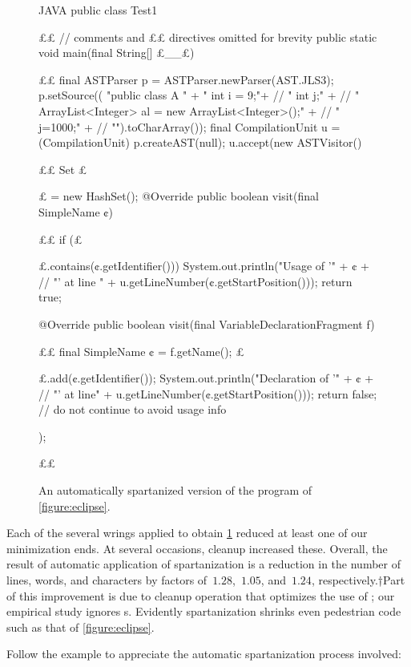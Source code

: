 \begin{figure}[htbp]
  \caption{\label{figure:eclipse:automatic}%
    An automatically spartanized version of
      the \Java program of \cref{figure:eclipse}.
    }
  \begin{adjustbox}{max width=\columnwidth}
\begin{code}[minipage, width=1.22\columnwidth]{JAVA}
public class Test1 {££ // comments and ££ directives omitted for brevity
  public static void main(final String[] £\_\_£) {££
    final ASTParser p = ASTParser.newParser(AST.JLS3);
    p.setSource((
      "public class A {\n" +
      " int i = 9;\n"+ //
      " int j;\n" + //
      " ArrayList<Integer> al = new ArrayList<Integer>();\n" + //
      " j=1000;\n" + //
      "}\n").toCharArray());
    final CompilationUnit u = (CompilationUnit) p.createAST(null);
    u.accept(new ASTVisitor() {££
      Set £\ignore$£$ = new HashSet();
      @Override public boolean visit(final SimpleName ¢) {££
        if (£\ignore$£$.contains(¢.getIdentifier()))
          System.out.println("Usage of '" + ¢ + //
            "' at line " + u.getLineNumber(¢.getStartPosition()));
        return true;
      }
      @Override public boolean visit(final VariableDeclarationFragment f) {££
        final SimpleName ¢ = f.getName();
        £\ignore$£$.add(¢.getIdentifier());
        System.out.println("Declaration of '" + ¢ + //
          "' at line" + u.getLineNumber(¢.getStartPosition()));
        return false; // do not continue to avoid usage info
      }
    });
  }££
}
\end{code}
  \end{adjustbox}
\end{figure}
Each of the several wrings applied to obtain \cref{figure:eclipse:automatic}
  reduced at least one of our minimization ends.
At several occasions, cleanup increased these.
Overall, the result of automatic application of spartanization
  is a reduction in the number of lines, words, and characters
  by factors of~$1.28$,~$1.05$, and~$1.24$, respectively.†{Part of this improvement
    is due to cleanup operation that optimizes the use of ; our empirical
  study ignores s.}
Evidently spartanization shrinks even pedestrian code such as that of
\cref{figure:eclipse}.

Follow the example to appreciate the automatic spartanization process involved:

